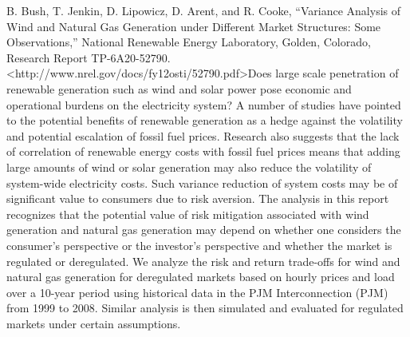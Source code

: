 \documentclass[]{article}
\begin{document}
B. Bush, T. Jenkin, D. Lipowicz, D. Arent, and R. Cooke, ``Variance
Analysis of Wind and Natural Gas Generation under Different Market
Structures: Some Observations,'' National Renewable Energy Laboratory,
Golden, Colorado, Research Report TP-6A20-52790.
\textless{}http://www.nrel.gov/docs/fy12osti/52790.pdf\textgreater{}Does
large scale penetration of renewable generation such as wind and solar
power pose economic and operational burdens on the electricity system? A
number of studies have pointed to the potential benefits of renewable
generation as a hedge against the volatility and potential escalation of
fossil fuel prices. Research also suggests that the lack of correlation
of renewable energy costs with fossil fuel prices means that adding
large amounts of wind or solar generation may also reduce the volatility
of system-wide electricity costs. Such variance reduction of system
costs may be of significant value to consumers due to risk aversion. The
analysis in this report recognizes that the potential value of risk
mitigation associated with wind generation and natural gas generation
may depend on whether one considers the consumer's perspective or the
investor's perspective and whether the market is regulated or
deregulated. We analyze the risk and return trade-offs for wind and
natural gas generation for deregulated markets based on hourly prices
and load over a 10-year period using historical data in the PJM
Interconnection (PJM) from 1999 to 2008. Similar analysis is then
simulated and evaluated for regulated markets under certain assumptions.
\end{document}
